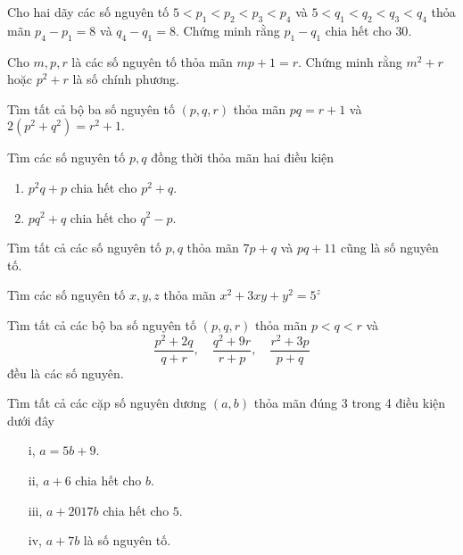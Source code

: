\begin{btt}
Cho hai dãy các số nguyên tố $5<p_{1}<p_{2}<p_{3}<p_{4}$ và $5<q_{1}<q_{2}<q_{3}<q_{4}$ thỏa mãn $p_{4}-p_{1}=8$ và $q_{4}-q_{1}=8.$ Chứng minh rằng $p_1-q_1$ chia hết cho $30.$
\end{btt}

\begin{btt}
Cho $m,p,r$ là các số nguyên tố thỏa mãn $mp+1=r.$ Chứng minh rằng $m^2+r$ hoặc $p^2+r$ là số chính phương.
\end{btt}

\begin{btt}
Tìm tất cả bộ ba số nguyên tố $(p,q,r)$ thỏa mãn $pq=r+1$ và $2\left(p^2+q^2\right)=r^2+1.$
\end{btt}

\begin{btt}
Tìm các số nguyên tố $p,q$ đồng thời thỏa mãn hai điều kiện
    \begin{enumerate}[i,]
        \item $p^2q+p$ chia hết cho $p^2+q.$
        \item $pq^2+q$ chia hết cho $q^2-p.$
    \end{enumerate}
\end{btt}

\begin{btt}
Tìm tất cả các số nguyên tố $p,q$ thỏa mãn $7p+q$ và $pq+11$ cũng là số nguyên tố.
\end{btt}

\begin{btt}
Tìm các số nguyên tố $x,y,z$ thỏa mãn $x^2+3xy+y^2=5^z$ 
\end{btt}

\begin{btt}
Tìm tất cả các bộ ba số nguyên tố \(\left ( p,q,r \right )\) thỏa mãn $p<q<r$ và
\[\dfrac{p^2+2q}{q+r},\quad \dfrac{q^2+9r}{r+p},\quad \dfrac{r^2+3p}{p+q}\]
đều là các số nguyên.
\end{btt}

\begin{btt}
Tìm tất cả các cặp số nguyên dương $ (a, b) $ thỏa mãn đúng 3 trong 4 điều kiện dưới đây
\begin{multicols}{2}
\begin{enumerate}
	\item[i,] $a=5b+9 $.
	\item[ii,] $a+6 $ chia hết cho $ b $.
	\item[iii,] $a+2017b $ chia hết cho $ 5 $.
	\item[iv,] $a+7b $ là số nguyên tố.
\end{enumerate}
\end{multicols}
\end{btt}

